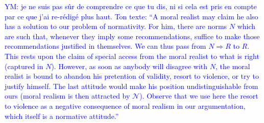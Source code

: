 \documentclass[preprint, french, english, 11pt, authoryear]{elsarticle}%
\newcommand{\commentYM}[1]{\textcolor{blue}{YM: #1}}
\newcommand{\adv}{\mathscr{N}}
\begin{document}
\commentYM{je ne suis pas sûr de comprendre ce que tu dis, ni si cela est pris en compte par ce que j'ai re-rédigé plus haut. Ton texte: ``A moral realist may claim he also has a solution to our problem of normativity. For him, there are norms $N$ which are such that, whenever they imply some recommendations, suffice to make those recommendations justified in themselves. We can thus pass from $N ⇒ R$ to $R$. This rests upon the claim of special access from the moral realist to what is right (captured in $N$). However, as soon as anybody will disagree with $N$, the moral realist is bound to abandon his pretention of validity, resort to violence, or try to justify himself. The last attitude would make his position undistinguishable from ours (moral realism is then attracted by $\adv$). Observe that we use here the resort to violence as a negative consequence of moral realism in our argumentation, which itself is a normative attitude.''}
\end{document}

